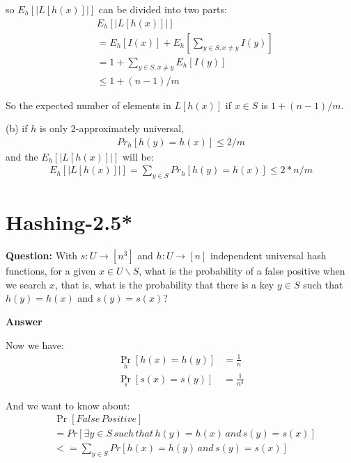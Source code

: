 \documentclass[12pt]{article}
\begin{document}
so $E_h[|L[h(x)]|]$ can be divided into two parts:
\begin{equation}
\begin{aligned}
    &E_h[|L[h(x)]|] \\
    &= E_h[I(x)]+ E_h [\sum_{y\in S, x \neq y} I(y)]  \\
    &= 1 + \sum_{y \in S, x \neq y} E_h[I(y)]\\
    &\leq 1 + (n - 1)/m
\end{aligned}
\end{equation}

So the expected number of elements in $L[h(x)]$ if $x \in S$ is $1 + (n - 1) / m$.

(b) if $h$ is only 2-approximately universal, 
\begin{align}
Pr_h[h(y) = h(x)] \leq 2/m
\end{align}
and the $E_h[|L[h(x)]|] $ will be:
\begin{align}
    E_h[|L[h(x)]|] = \sum_{y \in S} Pr_h[h(y) = h(x)] \leq 2 * n / m
\end{align}
\section{Hashing-2.5*}
\textbf{Question: }
With $s: U \rightarrow [n^3]$ and $h : U \rightarrow [n]$ independent universal hash functions, for a given $x \in U \backslash S$, what is the probability of a false positive when we search $x$, that is, what is the probability that there is a key $y \in S$ such that $h(y) = h(x)$ and $s(y) = s(x)$?

\textbf{Answer}

Now we have:
\begin{equation}
\begin{aligned}
\mathop{Pr} \limits_{h} [h(x)=h(y)] &= \frac{1}{n}\\
\mathop{Pr} \limits_{s} [s(x)=s(y)] &= \frac{1}{n^3}
\end{aligned}
\end{equation}

And we want to know about:
\begin{equation}
\begin{aligned}
&\mathop{Pr}  [False \, Positive]\\
&= Pr[\exists y \in S \, such \, that \, h(y) = h(x) \, and \, s(y) = s(x)]\\
&<= \sum_{y \in S} Pr[h(x)=h(y) \, and \, s(y)=s(x)]
\end{aligned}
\end{equation}
\end{document}
